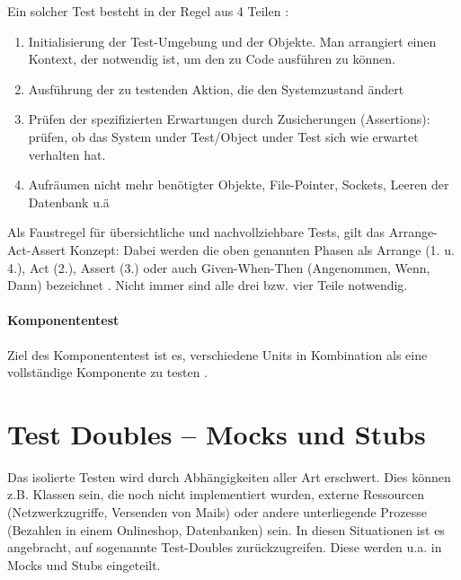 Ein solcher Test besteht in der Regel aus 4 Teilen \citep{rappin_rails_2011} \citep[Karte 46]{langr_agile_2011}:
\begin{enumerate}
 \item Initialisierung der Test-Umgebung und der Objekte. Man arrangiert einen Kontext, der notwendig ist, um den zu Code ausführen zu können.
 \item Ausführung der zu testenden Aktion, die den Systemzustand ändert
 \item Prüfen der spezifizierten Erwartungen durch Zusicherungen (Assertions): prüfen, ob das System under Test/Object under Test sich wie erwartet verhalten hat.
 \item Aufräumen nicht mehr benötigter Objekte, File-Pointer, Sockets, Leeren der Datenbank u.ä
\end{enumerate}
Als Faustregel für übersichtliche und nachvollziehbare Tests, gilt das Arrange-Act-Assert Konzept: Dabei werden die oben genannten Phasen als Arrange (1. u. 4.), Act (2.), Assert (3.) oder auch Given-When-Then (Angenommen, Wenn, Dann) bezeichnet \citep[Karte 46]{langr_agile_2011}. Nicht immer sind alle drei bzw. vier Teile notwendig.

\paragraph{Komponententest}
Ziel des Komponententest ist es, verschiedene Units in Kombination als eine vollständige Komponente zu testen \citep{goodliffe_code_2006}.

 \section{Test Doubles -- Mocks und Stubs}
  \label{sec:mocks}
  Das isolierte Testen wird durch Abhängigkeiten aller Art erschwert. Dies können z.B. Klassen sein, die noch nicht implementiert wurden, externe Ressourcen (Netzwerkzugriffe, Versenden von Mails) oder andere unterliegende Prozesse (Bezahlen in einem Onlineshop, Datenbanken) sein. In diesen Situationen ist es angebracht, auf sogenannte Test-Doubles zurückzugreifen. Diese werden u.a. in Mocks und Stubs eingeteilt.

